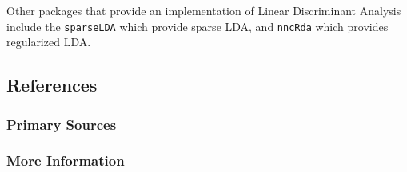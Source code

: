 

Other packages that provide an implementation of Linear Discriminant Analysis include the \texttt{sparseLDA} which provide sparse LDA, and \texttt{nncRda} which provides regularized LDA.




\subsection{References}

\subsubsection{Primary Sources}



\subsubsection{More Information}





